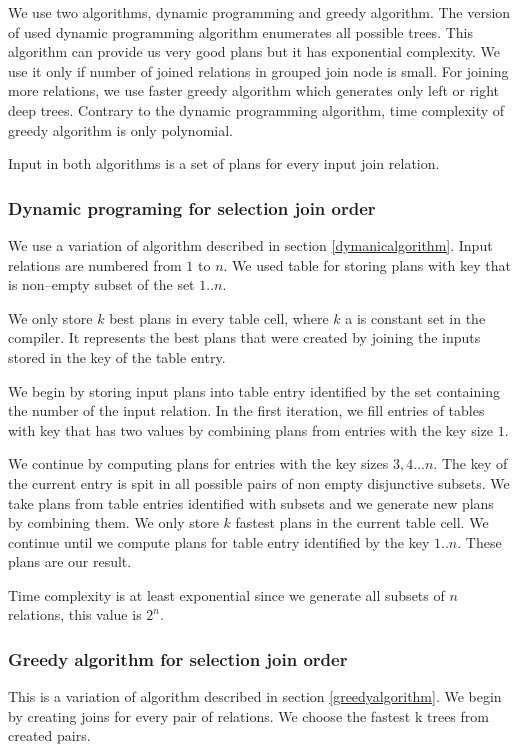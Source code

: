 We use two algorithms, dynamic programming and greedy algorithm. The version of used dynamic programming algorithm enumerates all possible trees. This algorithm can provide us very good plans but it has exponential complexity. We use it only if number of joined relations in grouped join node is small. For joining more relations, we use faster greedy algorithm which generates only left or right deep trees. Contrary to the dynamic programming algorithm, time complexity of greedy algorithm is only polynomial.

Input in both algorithms is a set of plans for every input join relation.

\subsubsection{Dynamic programing for selection join order}

We use a variation of algorithm described in section \ref{dymanicalgorithm}. Input relations are numbered from $1$ to $n$. We used table for storing plans with key that is non--empty subset of the set ${1..n}$.

We only store $k$ best plans in every table cell, where $k$ a is constant set in the compiler. It represents the best plans that were created by joining the inputs stored in the key of the table entry.

We begin by storing input plans into table entry identified by the set containing the number of the input relation. In the first iteration, we fill entries of tables with key that has two values by combining plans from entries with the key size $1$.

We continue by computing plans for entries with the key sizes $3,4...n$. The key of the current entry is spit in all possible pairs of non empty disjunctive subsets. We take plans from table entries identified with subsets and we generate new plans by combining them. We only store $k$ fastest plans in the current table cell.
We continue until we compute plans for table entry identified by the key ${1..n}$. These plans are our result.

Time complexity is at least exponential since we generate all subsets of $n$ relations, this value is $2^n$.


\subsubsection{Greedy algorithm for selection join order}
 This is a variation of algorithm described in section \ref{greedyalgorithm}. We begin by creating joins for every pair of relations. We choose the fastest k trees from created pairs.
 
